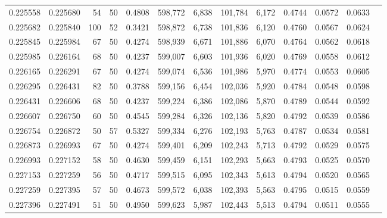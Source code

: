 \begin{tabular}{rrrrrrrrrrrrr}
0.225558 & 0.225680 &    54 &  50 &                                     0.4808 & 598,772 &   6,838 & 101,784 &   6,172 & 0.4744 & 0.0572 & 0.0633 \\
0.225682 & 0.225840 &   100 &  52 &                                     0.3421 & 598,872 &   6,738 & 101,836 &   6,120 & 0.4760 & 0.0567 & 0.0624 \\
0.225845 & 0.225984 &    67 &  50 &                                     0.4274 & 598,939 &   6,671 & 101,886 &   6,070 & 0.4764 & 0.0562 & 0.0618 \\
0.225985 & 0.226164 &    68 &  50 &                                     0.4237 & 599,007 &   6,603 & 101,936 &   6,020 & 0.4769 & 0.0558 & 0.0612 \\
0.226165 & 0.226291 &    67 &  50 &                                     0.4274 & 599,074 &   6,536 & 101,986 &   5,970 & 0.4774 & 0.0553 & 0.0605 \\
0.226295 & 0.226431 &    82 &  50 &                                     0.3788 & 599,156 &   6,454 & 102,036 &   5,920 & 0.4784 & 0.0548 & 0.0598 \\
0.226431 & 0.226606 &    68 &  50 &                                     0.4237 & 599,224 &   6,386 & 102,086 &   5,870 & 0.4789 & 0.0544 & 0.0592 \\
0.226607 & 0.226750 &    60 &  50 &                                     0.4545 & 599,284 &   6,326 & 102,136 &   5,820 & 0.4792 & 0.0539 & 0.0586 \\
0.226754 & 0.226872 &    50 &  57 &                                     0.5327 & 599,334 &   6,276 & 102,193 &   5,763 & 0.4787 & 0.0534 & 0.0581 \\
0.226873 & 0.226993 &    67 &  50 &                                     0.4274 & 599,401 &   6,209 & 102,243 &   5,713 & 0.4792 & 0.0529 & 0.0575 \\
0.226993 & 0.227152 &    58 &  50 &                                     0.4630 & 599,459 &   6,151 & 102,293 &   5,663 & 0.4793 & 0.0525 & 0.0570 \\
0.227153 & 0.227259 &    56 &  50 &                                     0.4717 & 599,515 &   6,095 & 102,343 &   5,613 & 0.4794 & 0.0520 & 0.0565 \\
0.227259 & 0.227395 &    57 &  50 &                                     0.4673 & 599,572 &   6,038 & 102,393 &   5,563 & 0.4795 & 0.0515 & 0.0559 \\
0.227396 & 0.227491 &    51 &  50 &                                     0.4950 & 599,623 &   5,987 & 102,443 &   5,513 & 0.4794 & 0.0511 & 0.0555 \\

\end{tabular}
